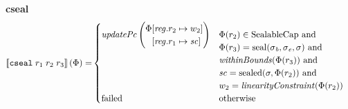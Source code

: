 \documentclass[a4paper]{article}
\begin{document}
\noindent\textbf{cseal}\\
\begin{align*}
  \sem{\tcseal{r_1}{r_2}{r_3}}(\Phi) = &
                                  \begin{cases}
                                    \updPcAddr{}\left(
                                    \arraycolsep=0pt
                                    \begin{array}{rl}
                                      \Phi&\updReg{r_2}{w_2}\\
                                          &\updReg{r_1}{\vsc}
                                    \end{array}\right)
&
                                    \arraycolsep=0pt
                                    \begin{array}[t]{l}
                                      \Phi(r_2) \in \SealableCaps \tand \\
                                      \Phi(r_3) = \seal{\sigma_\baddr, \sigma_\eaddr,\sigma} \tand \\
                                      \withinBounds{\Phi(r_3)} \tand \\
                                      \vsc = \sealed{\sigma,\Phi(r_2)} \tand\\
                                      w_2 = \linCons{\Phi(r_2)}                                     
                                    \end{array}
                                    \\
                                    \failed & \totherwise
                                  \end{cases}
\end{align*}
\end{document}
